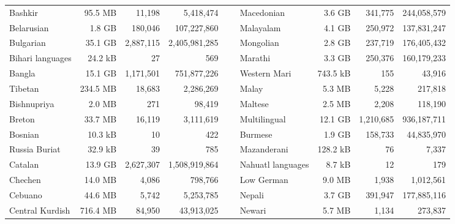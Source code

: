 \begin{table}[ht!]
{\begin{tabular}{lrrrclrrr}
            Bashkir                     & 95.5 MB   & 11,198      & 5,418,474       & ~ & Macedonian        & 3.6 GB    & 341,775    & 244,058,579    \\
            Belarusian                  & 1.8 GB    & 180,046     & 107,227,860     & ~ & Malayalam         & 4.1 GB    & 250,972    & 137,831,247    \\
            Bulgarian                   & 35.1 GB   & 2,887,115   & 2,405,981,285   & ~ & Mongolian         & 2.8 GB    & 237,719    & 176,405,432    \\
            Bihari languages            & 24.2 kB   & 27          & 569             & ~ & Marathi           & 3.3 GB    & 250,376    & 160,179,233    \\
            Bangla                      & 15.1 GB   & 1,171,501   & 751,877,226     & ~ & Western Mari      & 743.5 kB  & 155        & 43,916         \\
            Tibetan                     & 234.5 MB  & 18,683      & 2,286,269       & ~ & Malay             & 5.3 MB    & 5,228      & 217,818        \\
            Bishnupriya                 & 2.0 MB    & 271         & 98,419          & ~ & Maltese           & 2.5 MB    & 2,208      & 118,190        \\
            Breton                      & 33.7 MB   & 16,119      & 3,111,619       & ~ & Multilingual      & 12.1 GB   & 1,210,685  & 936,187,711    \\
            Bosnian                     & 10.3 kB   & 10          & 422             & ~ & Burmese           & 1.9 GB    & 158,733    & 44,835,970     \\
            Russia Buriat               & 32.9 kB   & 39          & 785             & ~ & Mazanderani       & 128.2 kB  & 76         & 7,337          \\
            Catalan                     & 13.9 GB   & 2,627,307   & 1,508,919,864   & ~ & Nahuatl languages & 8.7 kB    & 12         & 179            \\
            Chechen                     & 14.0 MB   & 4,086       & 798,766         & ~ & Low German        & 9.0 MB    & 1,938      & 1,012,561      \\
            Cebuano                     & 44.6 MB   & 5,742       & 5,253,785       & ~ & Nepali            & 3.7 GB    & 391,947    & 177,885,116    \\
            Central Kurdish             & 716.4 MB  & 84,950      & 43,913,025      & ~ & Newari            & 5.7 MB    & 1,134      & 273,837        \\

\end{tabular}}
\end{table}
